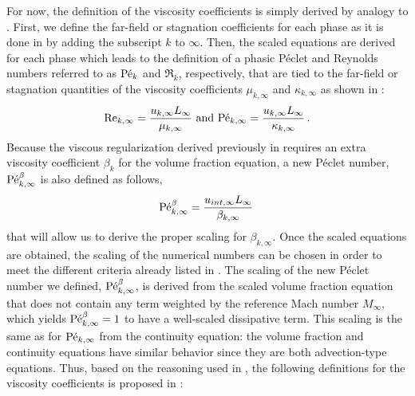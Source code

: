 For now, the definition of the viscosity coefficients is simply derived by analogy to . First, we define the far-field or stagnation coefficients for each phase as it is done in  by adding the subscript $k$ to $\infty$. Then, the scaled equations are derived for each phase which leads to the definition of a phasic P\'eclet and Reynolds numbers referred to as $\textrm{P\'e}_k$ and $\Re_k$, respectively, that are tied to the far-field or stagnation quantities of the viscosity coefficients $\mu_{k,\infty}$ and $\kappa_{k,\infty}$ as shown in :
%  
\begin{equation}
\label{eq:ref_numb_7eq}
\textrm{Re}_{k,\infty} = \frac{u_{k,\infty} L_\infty}{\mu_{k,\infty}} \text{ and }
\textrm{P\'e}_{k,\infty} = \frac{u_{k,\infty} L_\infty}{\kappa_{k,\infty}} \, .
\end{equation}
%
Because the viscous regularization derived previously in  requires an extra viscosity coefficient $\beta_k$ for the volume fraction equation, a new P\'eclet number, $\textrm{P\'e}_{k,\infty}^\beta$ is also defined as follows,
%
\begin{equation}
\label{eq:ref_numb_7eq_beta}
\textrm{P\'e}_{k,\infty}^\beta = \frac{u_{int,\infty} L_\infty}{\beta_{k,\infty}} \,
\end{equation}
%
that will allow us to derive the proper scaling for $\beta_{k,\infty}$. Once the scaled equations are obtained, the scaling of the numerical numbers can be chosen in order to meet the different criteria already listed in . The scaling of the new P\'eclet number we defined, $\textrm{P\'e}_{k,\infty}^\beta$, is derived from the scaled volume fraction equation that does not contain any term weighted by the reference Mach number $M_\infty$, which yields $\textrm{P\'e}_{k,\infty}^\beta=1$ to have a well-scaled dissipative term. This scaling is the same as for $\textrm{P\'e}_{k,\infty}$ from the continuity equation: the volume fraction and continuity equations have similar behavior since they are both advection-type equations. Thus, based on the reasoning used in , the following definitions for the viscosity coefficients is proposed in : 
%
